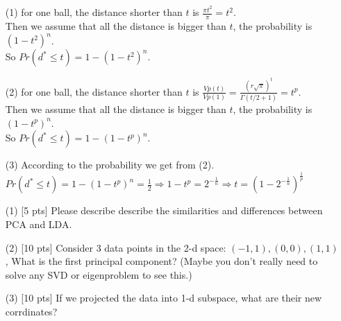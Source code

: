 \begin{solution}
    \begin{enumerate}
        \item[(1)] for one ball, the distance shorter than $t$ is $\frac{\pi t^2}{\pi}=t^2$.\\
            Then we assume that all the distance is bigger than $t$, the probability is $(1-t^2)^n$.\\
            So $Pr(d^{*}\leq t)=1-(1-t^2)^{n}$.
        \item[(2)] for one ball, the distance shorter than $t$ is $\frac{Vp(t)}{Vp(1)}=\frac{(r\sqrt{\pi})^{t}}{\Gamma(t/2+1)}=t^p$.\\
            Then we assume that all the distance is bigger than $t$, the probability is $(1-t^p)^n$.\\
            So $Pr(d^{*}\leq t)=1-(1-t^p)^{n}$.
        \item[(3)] According to the probability we get from (2).\\
            $Pr(d^*\leq t)=1-(1-t^p)^n=\frac{1}{2}\Rightarrow 1-t^p=2^{-\frac{1}{n}}\Rightarrow t=(1-2^{-\frac{1}{n}})^{\frac{1}{p}}$
    \end{enumerate}
\end{solution}
\begin{problem}
    \begin{enumerate}
        \item[(1)]  [5 pts] Please describe describe the similarities and differences between PCA and LDA.
        \item[(2)]  [10 pts] Consider 3 data points in the 2-d space: $(-1, 1), (0, 0), (1, 1)$, What is the first principal component? (Maybe you don’t really need to solve any SVD or eigenproblem to see this.)
        \item[(3)] [10 pts] If we projected the data into 1-d subspace, what are their new corrdinates?
    \end{enumerate}
\end{problem}



